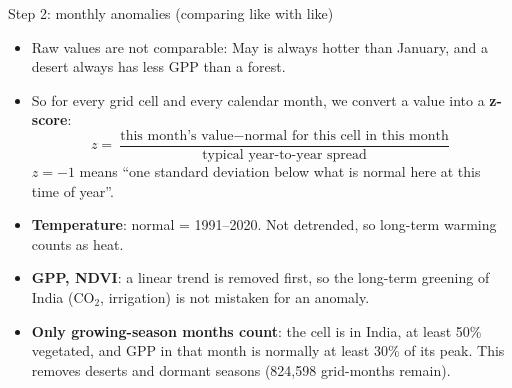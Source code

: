 \documentclass[11pt,aspectratio=169]{beamer}
\begin{document}
\begin{frame}{Step 2: monthly anomalies (comparing like with like)}
  \small
  \begin{itemize}
    \item Raw values are not comparable: May is always hotter than January,
      and a desert always has less GPP than a forest.
    \item So for every grid cell and every calendar month, we convert a value
      into a \textbf{z-score}:
      \[
        z = \frac{\text{this month's value} - \text{normal for this cell in this month}}
                 {\text{typical year-to-year spread}}
      \]
      $z = -1$ means ``one standard deviation below what is normal here at
      this time of year''.
    \item \textbf{Temperature}: normal = 1991--2020. Not detrended, so
      long-term warming counts as heat.
    \item \textbf{GPP, NDVI}: a linear trend is removed first, so the
      long-term greening of India (CO$_2$, irrigation) is not mistaken for
      an anomaly.
    \item \textbf{Only growing-season months count}: the cell is in India,
      at least 50\% vegetated, and GPP in that month is normally at least
      30\% of its peak. This removes deserts and dormant seasons
      (824,598 grid-months remain).
  \end{itemize}
\end{frame}
\end{document}
